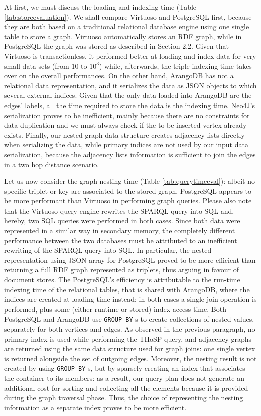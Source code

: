 At first, we must discuss the  loading and indexing time (Table \ref{tab:storeevaluation}). We shall  compare Virtuoso and PostgreSQL first, because they are both based on a traditional relational database engine using one single table to store a graph. Virtuoso automatically stores an RDF graph, while in PostgreSQL the graph was stored as described in Section 2.2. Given that Virtuoso is transactionless, it performed better at loading and index data for very small data sets (from $10$ to $10^3$) while, afterwards, the triple indexing time takes over on the overall performances. On the other hand, ArangoDB has not a relational data representation, and it  serializes the data as JSON objects to which several external indices. Given that the only data loaded into ArangoDB are the edges' labels, all the time required to store the data is the indexing time. Neo4J's serialization proves to be inefficient, mainly because there are no constraints for data duplication and we must always check if the to-be-inserted vertex already exists. Finally, our nested graph data structure creates adjacency lists directly when serializing the data, while primary indices are not used by our input data serialization, because the adjacency lists information is sufficient to join the edges in a two hop distance scenario.

Let us now consider the graph nesting time (Table \ref{tab:querytimeeval}): albeit no specific triplet or key are associated to the stored graph, PostgreSQL appears to be more performant than Virtuoso in performing graph queries. Please also note that the Virtuoso query engine rewrites the SPARQL query into SQL and, hereby, two SQL queries were performed in both cases. Since both data were represented in a similar way in secondary memory, the completely different performance between the two databases must be attributed  to an inefficient rewriting of the SPARQL query into SQL. In particular, the nested representation using JSON array for PostgreSQL proved to be more efficient than returning a full RDF graph represented as triplets, thus arguing in favour of document stores. The PostgreSQL's efficiency is attributable to the run-time indexing time of the relational tables, that is shared with ArangoDB, where the indices are created at loading time instead: in both cases a single join operation is performed, plus some (either runtime or stored) index access time. Both PostgreSQL and ArangoDB use \texttt{GROUP BY}-s to create collections of nested values, separately for both vertices and edges. As observed in the previous paragraph, no primary index is used while performing the THoSP query, and adjacency graphs are returned using the same data structure used for graph joins: one single vertex is returned alongside the set of outgoing edges. Moreover, the nesting result is not created by using \texttt{GROUP BY}-s, but by sparsely creating an index that associates the container to its members: as a result, our query plan does not generate an additional cost for sorting and collecting all the elements because it is provided during the graph traversal phase. Thus, the choice of representing the nesting information as a separate index proves to be more efficient.
